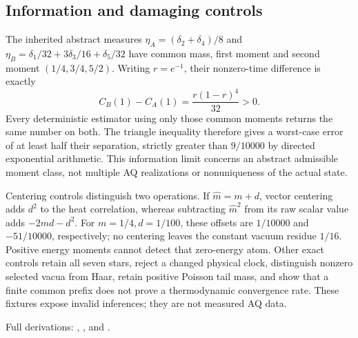 \subsection{Information and damaging controls}
The inherited abstract measures
$\eta_A=(\delta_2+\delta_4)/8$ and
$\eta_B=\delta_1/32+3\delta_3/16+\delta_5/32$
have common mass, first moment and second moment $(1/4,3/4,5/2)$.
Writing $r=e^{-1}$, their nonzero-time difference is exactly
\begin{equation}
 C_B(1)-C_A(1)=\frac{r(1-r)^4}{32}>0.
\end{equation}
Every deterministic estimator using only those common moments returns the same
number on both. The triangle inequality therefore gives a worst-case error of
at least half their separation, strictly greater than $9/10000$ by directed
exponential arithmetic. This information limit concerns an abstract admissible
moment class, not multiple AQ realizations or nonuniqueness of the actual state.

Centering controls distinguish two operations. If $\widehat m=m+d$, vector
centering adds $d^2$ to the heat correlation, whereas subtracting
$\widehat m^2$ from its raw scalar value adds $-2md-d^2$. For
$m=1/4,d=1/100$, these offsets are $1/10000$ and $-51/10000$, respectively;
no centering leaves the constant vacuum residue $1/16$. Positive energy moments
cannot detect that zero-energy atom. Other exact controls retain all seven
stars, reject a changed physical clock, distinguish nonzero selected vacua from
Haar, retain positive Poisson tail mass, and show that a finite common prefix
does not prove a thermodynamic convergence rate. These fixtures expose invalid
inferences; they are not measured AQ data.

Full derivations:
,
, and
.
